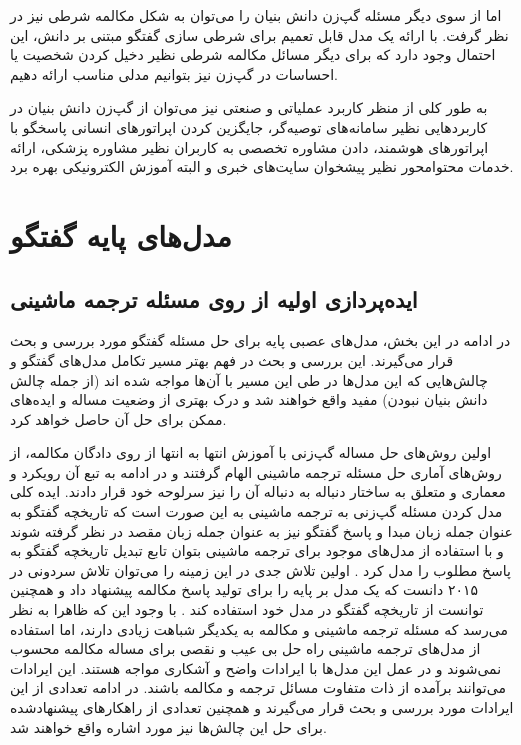 اما از سوی دیگر مسئله گپ‌زن دانش بنیان را می‌توان به شکل مکالمه شرطی نیز در نظر گرفت. با ارائه یک مدل قابل تعمیم برای شرطی سازی گفتگو مبتنی بر دانش، این احتمال وجود دارد که برای دیگر مسائل مکالمه شرطی نظیر دخیل کردن شخصیت یا احساسات در گپ‌زن نیز بتوانیم مدلی مناسب ارائه دهیم.

به طور  کلی از منظر کاربرد عملیاتی و صنعتی نیز می‌توان از گپ‌زن دانش بنیان در کاربرد‌هایی نظیر سامانه‌های توصیه‌گر،
 جایگزین کردن اپراتور‌های انسانی پاسخگو با اپراتور‌های هوشمند، دادن مشاوره تخصصی به کاربران نظیر مشاوره پزشکی، ارائه خدمات محتوامحور نظیر پیشخوان سایت‌های خبری و البته آموزش الکترونیکی بهره برد.  

\section{مدل‌های پایه گفتگو} \label{chap1:history}

\subsection{ایده‌پردازی اولیه از روی مسئله ترجمه ماشینی}

در ادامه در این بخش، مدل‌های  عصبی پایه برای حل مسئله گفتگو مورد بررسی و بحث قرار می‌گیرند. این بررسی و بحث در فهم بهتر مسیر تکامل مدل‌های گفتگو و چالش‌هایی که این مدل‌ها در طی این مسیر با آن‌ها مواجه شده اند (از جمله چالش دانش‌ بنیان نبودن) مفید واقع خواهند شد و درک بهتری از وضعیت مساله و ایده‌های ممکن برای حل آن حاصل خواهد کرد.

اولین روش‌های حل مساله گپ‌زنی با آموزش انتها به انتها 	از روی دادگان مکالمه، از روش‌های آماری حل مسئله ترجمه ماشینی الهام گرفتند و در ادامه به تبع آن رویکرد و معماری 
و
متعلق به ساختار دنباله به دنباله آن را نیز سرلوحه خود قرار دادند. ایده کلی مدل‌ کردن مسئله گپ‌زنی به ترجمه ماشینی به این صورت است که تاریخچه گفتگو به عنوان جمله زبان مبدا و پاسخ گفتگو نیز به عنوان جمله زبان مقصد در نظر گرفته شوند و با استفاده از مدل‌های موجود برای ترجمه ماشینی بتوان تابع تبدیل تاریخچه گفتگو به پاسخ مطلوب را مدل کرد
\cite{ritter-etal-2011-data}
.
اولین تلاش جدی در این زمینه را می‌‌توان تلاش سردونی در ۲۰۱۵ دانست که یک مدل بر پایه 
را برای تولید پاسخ مکالمه پیشنهاد داد و همچنین توانست از تاریخچه گفتگو در مدل خود استفاده کند
\cite{DBLP:journals/corr/SordoniGABJMNGD15}
.
با وجود این که ظاهرا به نظر می‌رسد که مسئله ترجمه ماشینی و مکالمه به یکدیگر شباهت زیادی دارند، اما استفاده از مدل‌های ترجمه ماشینی راه حل بی عیب و نقصی برای مساله مکالمه محسوب نمی‌شوند و در عمل این مدل‌ها با ایرادات واضح و آشکاری مواجه هستند. این ایرادات می‌توانند برآمده از ذات متفاوت مسائل ترجمه و مکالمه باشند. در ادامه تعدادی از این ایرادات 
مورد بررسی و بحث قرار می‌گیرند و همچنین تعدادی از راهکارهای پیشنهادشده برای حل این چالش‌ها نیز مورد اشاره واقع خواهند شد. 


